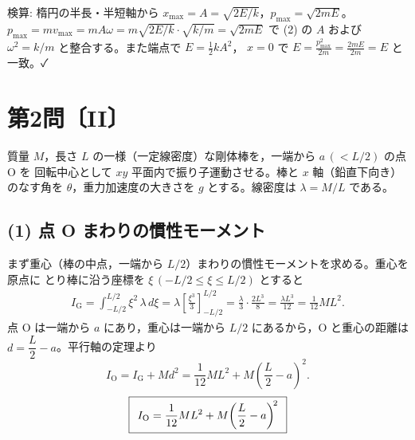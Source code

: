 \documentclass[11pt,a4paper]{article}
\begin{document}
\begin{center}
\end{center}

\medskip
検算: 楕円の半長・半短軸から $x_{\max}=A=\sqrt{2E/k}$，$p_{\max}=\sqrt{2mE}$。
$p_{\max}=m v_{\max}=mA\omega=m\sqrt{2E/k}\cdot\sqrt{k/m}=\sqrt{2mE}$ で
(2) の $A$ および $\omega^2=k/m$ と整合する。また端点で $E=\frac12 kA^2$，
$x=0$ で $E=\frac{p_{\max}^2}{2m}=\frac{2mE}{2m}=E$ と一致。✓

\clearpage
\section*{第2問〔II〕}

質量 $M$，長さ $L$ の一様（一定線密度）な剛体棒を，一端から $a\,(<L/2)$ の点 O を
回転中心として $xy$ 平面内で振り子運動させる。棒と $x$ 軸（鉛直下向き）のなす角を
$\theta$，重力加速度の大きさを $g$ とする。線密度は $\lambda=M/L$ である。

\subsection*{(1) 点 O まわりの慣性モーメント}
まず重心（棒の中点，一端から $L/2$）まわりの慣性モーメントを求める。重心を原点に
とり棒に沿う座標を $\xi\,(-L/2\le\xi\le L/2)$ とすると
\begin{align*}
  I_{\mathrm{G}}=\int_{-L/2}^{L/2}\xi^2\,\lambda\,d\xi
   =\lambda\left[\frac{\xi^3}{3}\right]_{-L/2}^{L/2}
   =\frac{\lambda}{3}\cdot\frac{2L^3}{8}
   =\frac{\lambda L^3}{12}=\frac{1}{12}ML^2 .
\end{align*}
点 O は一端から $a$ にあり，重心は一端から $L/2$ にあるから，O と重心の距離は
$d=\dfrac{L}{2}-a$。平行軸の定理より
\[
  I_{\mathrm O}=I_{\mathrm G}+M d^2
   =\frac{1}{12}ML^2+M\!\left(\frac{L}{2}-a\right)^{\!2}.
\]
\[
  \boxed{\,\;I_{\mathrm O}=\dfrac{1}{12}ML^2+M\!\left(\dfrac{L}{2}-a\right)^{\!2}\;\,}
\]
\end{document}
